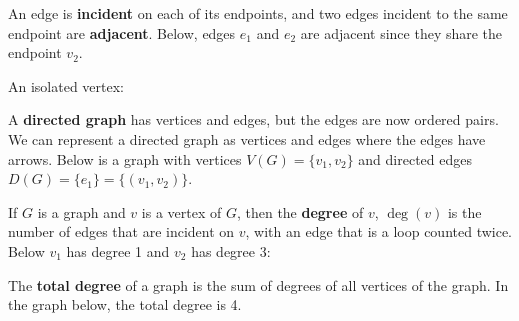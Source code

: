 \documentclass[11pt]{article}
\begin{document}
\begin{center}
\end{center}

An edge is {\bf incident} on each of its endpoints, and two edges incident 
to the same endpoint are {\bf adjacent}. Below, edges $e_1$ and $e_2$ are 
adjacent since they share the endpoint $v_2$. 
\begin{center}
\end{center}

An isolated vertex:
\begin{center}
\end{center}

\newpage
{}
A {\bf directed graph} has vertices and edges, but the edges are now ordered 
pairs. We can represent a directed graph as vertices and edges where the edges 
have arrows. Below is a graph with vertices $V(G) = \{v_1, v_2\}$ and directed 
edges $D(G) = \{e_1\} = \{(v_1, v_2)\}$. 

\begin{center}
\end{center}

If $G$ is a graph and $v$ is a vertex of $G$, then the {\bf degree} of $v$, 
$\deg(v)$ is the number of edges that are incident on $v$, with an edge that 
is a loop counted twice. Below $v_1$ has degree 1 and $v_2$ has degree 3:
\begin{center}
\end{center}

The {\bf total degree} of a graph is the sum of degrees of all vertices of the 
graph. In the graph below, the total degree is 4. 
\begin{center}
\end{center}
\end{document}
